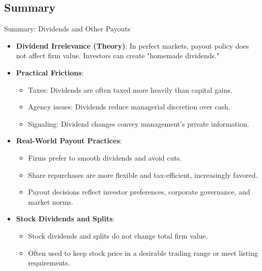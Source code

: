 \subsection*{Summary}
\begin{frame}{Summary: Dividends and Other Payouts}
\footnotesize
\begin{itemize}
  \item \textbf{Dividend Irrelevance (Theory)}: In perfect markets, payout policy does not affect firm value. Investors can create "homemade dividends."
  \item \textbf{Practical Frictions}:
  \begin{itemize}
    \item Taxes: Dividends are often taxed more heavily than capital gains.
    \item Agency issues: Dividends reduce managerial discretion over cash.
    \item Signaling: Dividend changes convey management's private information.
  \end{itemize}
  \item \textbf{Real-World Payout Practices}:
  \begin{itemize}
    \item Firms prefer to smooth dividends and avoid cuts.
    \item Share repurchases are more flexible and tax-efficient, increasingly favored.
    \item Payout decisions reflect investor preferences, corporate governance, and market norms.
  \end{itemize}
  \item \textbf{Stock Dividends and Splits}:
  \begin{itemize}
    \item Stock dividends and splits do not change total firm value.
    \item Often used to keep stock price in a desirable trading range or meet listing requirements.
  \end{itemize}
\end{itemize}
\end{frame}
